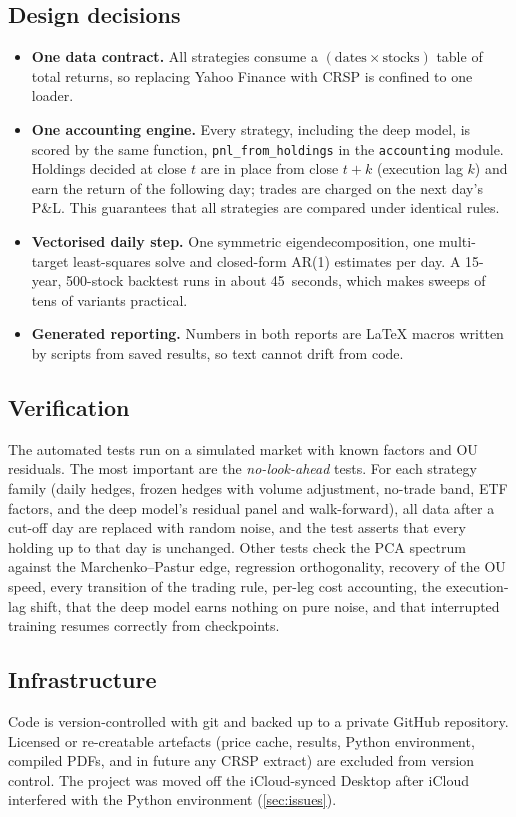 \documentclass[11pt,a4paper]{article}
\newcommand{\code}[1]{\texttt{#1}}
\begin{document}
\subsection{Design decisions}
\begin{itemize}
  \item \textbf{One data contract.} All strategies consume a $(\text{dates}\times\text{stocks})$
        table of total returns, so replacing Yahoo Finance with CRSP is confined to one loader.
  \item \textbf{One accounting engine.} Every strategy, including the deep model, is scored by
        the same function, \code{pnl\_from\_holdings} in the \code{accounting} module. Holdings decided at close $t$ are in place from close
        $t+k$ (execution lag $k$) and earn the return of the following day; trades are charged on the
        next day's P\&L. This guarantees that all strategies are compared under identical rules.
  \item \textbf{Vectorised daily step.} One symmetric eigendecomposition, one multi-target
        least-squares solve and closed-form AR(1) estimates per day. A 15-year, 500-stock backtest
        runs in about 45~seconds, which makes sweeps of tens of variants practical.
  \item \textbf{Generated reporting.} Numbers in both reports are \LaTeX{} macros written by
        scripts from saved results, so text cannot drift from code.
\end{itemize}

\subsection{Verification}
The \MPNTests{} automated tests run on a simulated market with known factors and OU residuals.
The most important are the \emph{no-look-ahead} tests. For each strategy family (daily hedges,
frozen hedges with volume adjustment, no-trade band, ETF factors, and the deep model's residual
panel and walk-forward), all data after a cut-off day are replaced with random noise, and the
test asserts that every holding up to that day is unchanged. Other tests check the PCA
spectrum against the Marchenko--Pastur edge, regression orthogonality, recovery of the OU
speed, every transition of the trading rule, per-leg cost accounting, the execution-lag shift,
that the deep model earns nothing on pure noise, and that interrupted training resumes
correctly from checkpoints.

\subsection{Infrastructure}
Code is version-controlled with git and backed up to a private GitHub repository. Licensed or
re-creatable artefacts (price cache, results, Python environment, compiled PDFs, and in future
any CRSP extract) are excluded from version control. The project was moved off the
iCloud-synced Desktop after iCloud interfered with the Python environment
(\cref{sec:issues}).
\end{document}
